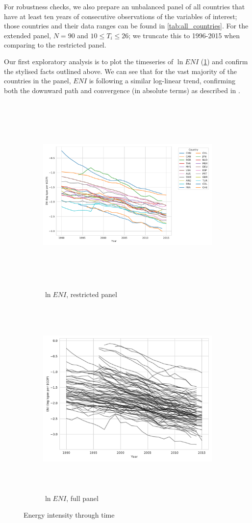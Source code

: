 \documentclass[12pt,a4paper]{article}
\begin{document}
For robustness checks, we also prepare an unbalanced panel of all countries that have at least ten years of consecutive observations of the variables of interest; those countries and their data ranges can be found in \cref{tab:all_countries}.
For the extended panel, $N = 90$ and $ 10 \leq T_i \leq 26$; we truncate this to 1996-2015 when comparing to the restricted panel.

Our first exploratory analysis is to plot the timeseries of $\ln ENI$ (\cref{fig:ENI_timeseries}) and confirm the stylised facts outlined above.
We can see that for the vast majority of the countries in the panel, $ENI$ is following a similar log-linear trend, confirming both the downward path and convergence (in absolute terms) as described in \cite{ederAnalysisEnergyIntensity2018}.

\begin{figure}[htbp]
\centering
\begin{subfigure}{\textwidth}
\includegraphics[height=10cm]{./plots/dis/timeseries_ENI_subset.pdf}
\caption{$\ln ENI$, restricted panel}
\end{subfigure}
\begin{subfigure}{\textwidth}
\includegraphics[height=10cm]{./plots/dis/timeseries_ENI_all.pdf}
\caption{$\ln ENI$, full panel}
\end{subfigure}
\caption{Energy intensity through time}
\label{fig:ENI_timeseries}
\end{figure}
\end{document}
